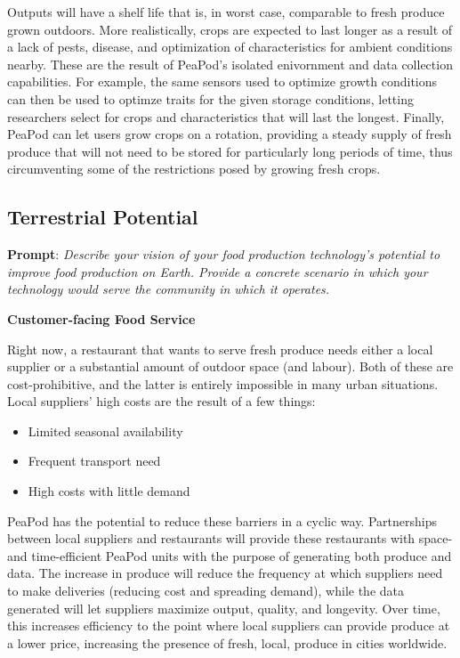 \documentclass{report}
\begin{document}
Outputs will have a shelf life that is, in worst case, comparable to fresh produce grown outdoors. More realistically, crops are expected to last longer as a result of a lack of pests, disease, and optimization of characteristics for ambient conditions nearby. These are the result of PeaPod's isolated enivornment and data collection capabilities. For example, the same sensors used to optimize growth conditions can then be used to optimze traits for the given storage conditions, letting researchers select for crops and characteristics that will last the longest. Finally, PeaPod can let users grow crops on a rotation, providing a steady supply of fresh produce that will not need to be stored for particularly long periods of time, thus circumventing some of the restrictions posed by growing fresh crops.


\subsection{Terrestrial Potential}
\label{sec:terrestrial}

\textbf{Prompt}: \textit{Describe your vision of your food production technology’s potential to improve food production on Earth. Provide a concrete scenario in which your technology would serve the community in which it operates.}


\textbf{Customer-facing Food Service} %

Right now, a restaurant that wants to serve fresh produce needs either a local supplier or a substantial amount of outdoor space (and labour). Both of these are cost-prohibitive, and the latter is entirely impossible in many urban situations. Local suppliers' high costs are the result of a few things:
\begin{itemize}
    \item Limited seasonal availability
    \item Frequent transport need
    \item High costs with little demand
\end{itemize}
PeaPod has the potential to reduce these barriers in a cyclic way. Partnerships between local suppliers and restaurants will provide these restaurants with space- and time-efficient PeaPod units with the purpose of generating both produce and data. The increase in produce will reduce the frequency at which suppliers need to make deliveries (reducing cost and spreading demand), while the data generated will let suppliers maximize output, quality, and longevity. Over time, this increases efficiency to the point where local suppliers can provide produce at a lower price, increasing the presence of fresh, local, produce in cities worldwide.
\end{document}
